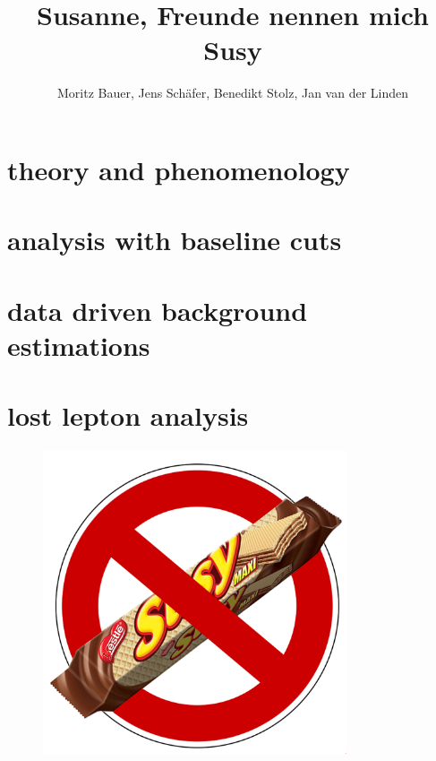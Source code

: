 \documentclass[18pt]{beamer}
\title[SUSY]{Susanne, Freunde nennen mich Susy}
\author{Moritz Bauer, Jens Schäfer, Benedikt Stolz, Jan van der Linden}
\institute{Institut für Experimentelle Teilchenphysik (ETP)}
\begin{document}

\begin{frame}
\titlepage
\end{frame}



\section{theory and phenomenology}

\section{analysis with baseline cuts}

\section{data driven background estimations}

\section{lost lepton analysis}


\begin{frame}
  \begin{figure}[H]
    \centering
    \includegraphics[width=0.8\textwidth,height=0.8\textheight,keepaspectratio]{logos/no_susy}
  \end{figure}
\end{frame}
\end{document}
